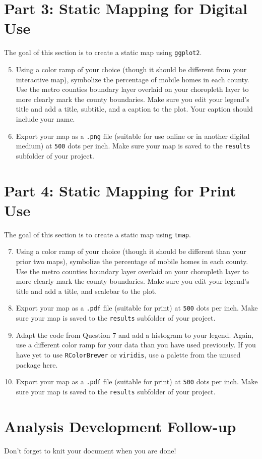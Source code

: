 \documentclass{tufte-handout}
\begin{document}
\vspace{5mm}
\section{Part 3: Static Mapping for Digital Use}
The goal of this section is to create a static map using \texttt{ggplot2}. 
\begin{enumerate}
\setcounter{enumi}{4}
\item Using a color ramp of your choice (though it should be different from your interactive map), symbolize the percentage of mobile homes in each county. Use the metro counties boundary layer overlaid on your choropleth layer to more clearly mark the county boundaries. Make sure you edit your legend's title and add a title, subtitle, and a caption to the plot. Your caption should include your name.
\item Export your map as a \texttt{.png} file (suitable for use online or in another digital medium) at \texttt{500} dots per inch. Make sure your map is saved to the \texttt{results} subfolder of your project.
\end{enumerate}

\vspace{5mm}
\section{Part 4: Static Mapping for Print Use}
The goal of this section is to create a static map using \texttt{tmap}. 
\begin{enumerate}
\setcounter{enumi}{6}
\item Using a color ramp of your choice (though it should be different than your prior two maps), symbolize the percentage of mobile homes in each county. Use the metro counties boundary layer overlaid on your choropleth layer to more clearly mark the county boundaries. Make sure you edit your legend's title and add a title, and scalebar to the plot.
\item Export your map as a \texttt{.pdf} file (suitable for print) at \texttt{500} dots per inch. Make sure your map is saved to the \texttt{results} subfolder of your project.
\item Adapt the code from Question 7 and add a histogram to your legend. Again, use a different color ramp for your data than you have used previously. If you have yet to use \texttt{RColorBrewer} or \texttt{viridis}, use a palette from the unused package here.
\item Export your map as a \texttt{.pdf} file (suitable for print) at \texttt{500} dots per inch. Make sure your map is saved to the \texttt{results} subfolder of your project.
\end{enumerate}

\vspace{5mm}
\section{Analysis Development Follow-up}
Don't forget to knit your document when you are done!


\end{document}
